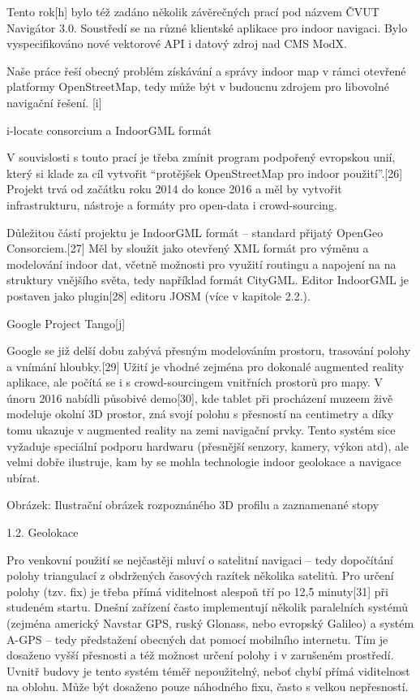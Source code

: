 Tento rok[h] bylo též zadáno několik závěrečných prací pod názvem ČVUT Navigátor 3.0. Soustředí se na různé klientské aplikace pro indoor navigaci. Bylo vyspecifikováno nové vektorové API i datový zdroj nad CMS ModX.

Naše práce řeší obecný problém získávání a správy indoor map v rámci otevřené platformy OpenStreetMap, tedy může být v budoucnu zdrojem pro libovolné navigační řešení. [i]

i-locate consorcium a IndoorGML formát



V souvislosti s touto prací je třeba zmínit program podpořený evropskou unií, který si klade za cíl vytvořit “protějšek OpenStreetMap pro indoor použití”.[26] Projekt trvá od začátku roku 2014 do konce 2016 a měl by vytvořit infrastrukturu, nástroje a formáty pro open-data i crowd-sourcing.

Důležitou částí projektu je IndoorGML formát – standard přijatý OpenGeo Consorciem.[27] Měl by sloužit jako otevřený XML formát pro výměnu a modelování indoor dat, včetně možnosti pro využití routingu a napojení na na struktury vnějšího světa, tedy například formát CityGML. Editor IndoorGML je postaven jako plugin[28] editoru JOSM (více v kapitole 2.2.).

Google Project Tango[j]



Google se již delší dobu zabývá přesným modelováním prostoru, trasování polohy a vnímání hloubky.[29] Užití je vhodné zejména pro dokonalé augmented reality aplikace, ale počítá se i s crowd-sourcingem vnitřních prostorů pro mapy. V únoru 2016 nabídli působivé demo[30], kde tablet při procházení muzeem živě modeluje okolní 3D prostor, zná svojí polohu s přesností na centimetry a díky tomu ukazuje v augmented reality na zemi navigační prvky. Tento systém sice vyžaduje speciální podporu hardwaru (přesnější senzory, kamery, výkon atd), ale velmi dobře ilustruje, kam by se mohla technologie indoor geolokace a navigace ubírat.



Obrázek: Ilustrační obrázek rozpoznáného 3D profilu a zaznamenané stopy

1.2. Geolokace



Pro venkovní použití se nejčastěji mluví o satelitní navigaci – tedy dopočítání polohy triangulací z obdržených časových razítek několika satelitů. Pro určení polohy (tzv. fix) je třeba přímá viditelnost alespoň tří po 12,5 minuty[31] při studeném startu. Dnešní zařízení často implementují několik paralelních systémů (zejména americký Navstar GPS, ruský Glonass, nebo evropský Galileo) a systém A-GPS – tedy předstažení obecných dat pomocí mobilního internetu. Tím je dosaženo vyšší přesnosti a též možnost určení polohy i v zarušeném prostředí. Uvnitř budovy je tento systém téměř nepoužitelný, neboť chybí přímá viditelnost na oblohu. Může být dosaženo pouze náhodného fixu, často s velkou nepřesností.

